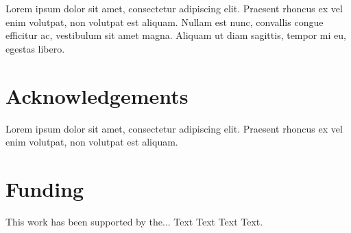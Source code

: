 \documentclass{bioinfo}
\begin{document}
Lorem ipsum dolor sit amet, consectetur adipiscing elit. Praesent 
rhoncus ex vel enim volutpat, non volutpat est aliquam. Nullam est 
nunc, convallis congue efficitur ac, vestibulum sit amet magna. 
Aliquam ut diam sagittis, tempor mi eu, egestas libero.

\section*{Acknowledgements}

Lorem ipsum dolor sit amet, consectetur adipiscing elit. Praesent 
rhoncus ex vel enim volutpat, non volutpat est aliquam.
\vspace*{-12pt}

\section*{Funding}

This work has been supported by the... Text Text  Text Text.\vspace*{-12pt}


%
%
%
%

%

\end{document}
